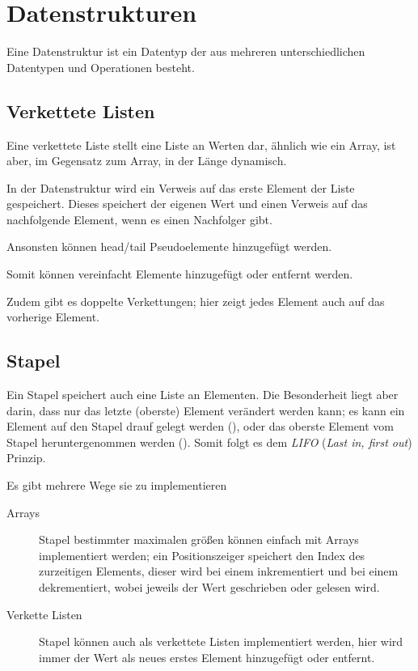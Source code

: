 \documentclass{article}
\begin{document}
\section{Datenstrukturen} 
Eine Datenstruktur ist ein Datentyp der aus mehreren unterschiedlichen Datentypen und Operationen besteht.

\subsection{Verkettete Listen} 
Eine verkettete Liste stellt eine Liste an Werten dar, ähnlich wie ein Array, ist aber, im Gegensatz zum Array, in der Länge dynamisch.

In der Datenstruktur wird ein Verweis auf das erste Element der Liste gespeichert. Dieses speichert der eigenen Wert und einen Verweis auf das nachfolgende Element, wenn es einen Nachfolger gibt.

Ansonsten können head/tail Pseudoelemente hinzugefügt werden.

Somit können vereinfacht Elemente hinzugefügt oder entfernt werden.

Zudem gibt es doppelte Verkettungen; hier zeigt jedes Element auch auf das vorherige Element.

\subsection{Stapel}
Ein Stapel speichert auch eine Liste an Elementen. Die Besonderheit liegt aber darin, dass nur das letzte (oberste) Element verändert werden kann; es kann ein Element auf den Stapel drauf gelegt werden (), oder das oberste Element vom Stapel heruntergenommen werden (). Somit folgt es dem \emph{LIFO} (\emph{Last in, first out}) Prinzip.

Es gibt mehrere Wege sie zu implementieren
\begin{description}
 \item[Arrays] Stapel bestimmter maximalen größen können einfach mit Arrays implementiert werden; ein Positionszeiger speichert den Index des zurzeitigen Elements, dieser wird bei einem  inkrementiert und bei einem  dekrementiert, wobei jeweils der Wert geschrieben oder gelesen wird.
 \item[Verkette Listen] Stapel können auch als verkettete Listen implementiert werden, hier wird immer der Wert als neues erstes Element hinzugefügt oder entfernt.
\end{description} 
\end{document}
